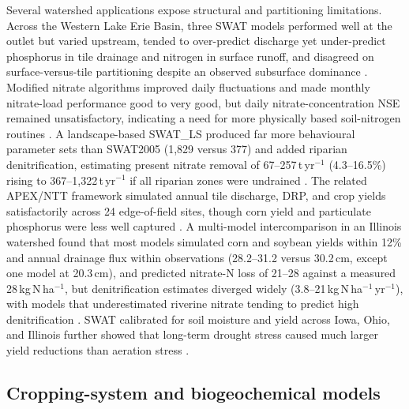 \documentclass[11pt]{article}
\begin{document}
Several watershed applications expose structural and partitioning limitations. Across the Western Lake Erie Basin, three SWAT models performed well at the outlet but varied upstream, tended to over-predict discharge yet under-predict phosphorus in tile drainage and nitrogen in surface runoff, and disagreed on surface-versus-tile partitioning despite an observed subsurface dominance \parencite{Apostel2021}. Modified nitrate algorithms improved daily fluctuations and made monthly nitrate-load performance good to very good, but daily nitrate-concentration NSE remained unsatisfactory, indicating a need for more physically based soil-nitrogen routines \parencite{Ikenberry2017}. A landscape-based SWAT\_LS produced far more behavioural parameter sets than SWAT2005 (1{,}829 versus 377) and added riparian denitrification, estimating present nitrate removal of 67--257\,t\,yr$^{-1}$ (4.3--16.5\%) rising to 367--1{,}322\,t\,yr$^{-1}$ if all riparian zones were undrained \parencite{Hoang2017}. The related APEX/NTT framework simulated annual tile discharge, DRP, and crop yields satisfactorily across 24 edge-of-field sites, though corn yield and particulate phosphorus were less well captured \parencite{Guo2020b}. A multi-model intercomparison in an Illinois watershed found that most models simulated corn and soybean yields within 12\% and annual drainage flux within observations (28.2--31.2 versus 30.2\,cm, except one model at 20.3\,cm), and predicted nitrate-N loss of 21--28 against a measured 28\,kg\,N\,ha$^{-1}$, but denitrification estimates diverged widely (3.8--21\,kg\,N\,ha$^{-1}$\,yr$^{-1}$), with models that underestimated riverine nitrate tending to predict high denitrification \parencite{David2009}. SWAT calibrated for soil moisture and yield across Iowa, Ohio, and Illinois further showed that long-term drought stress caused much larger yield reductions than aeration stress \parencite{Wang2016}.

\subsection{Cropping-system and biogeochemical models}
\end{document}
